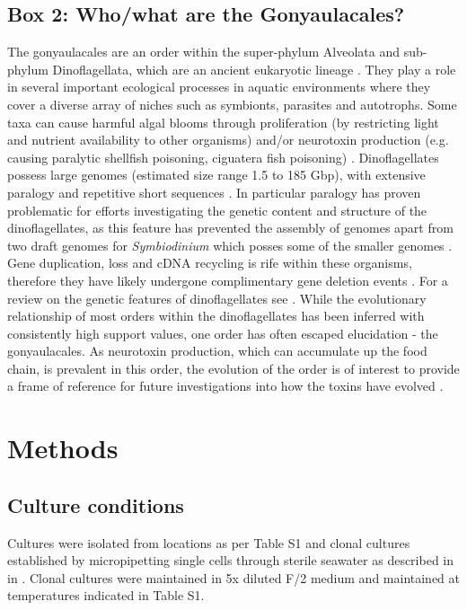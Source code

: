 \documentclass[fleqn,10pt,lineno]{wlpeerj} %
\begin{document}
\subsection*{Box 2: Who/what are the Gonyaulacales?}
\label{sec:dinobox}
The gonyaulacales are an order within the super-phylum Alveolata and sub-phylum Dinoflagellata, which are an ancient eukaryotic lineage \citep{moldowan1998biogeochemical}. 
They play a role in several important ecological processes in aquatic environments where they cover a diverse array of niches such as symbionts, parasites and autotrophs. 
Some taxa can cause harmful algal blooms through proliferation (by restricting light and nutrient availability to other organisms) and/or neurotoxin production (e.g. causing paralytic shellfish poisoning, ciguatera fish poisoning) \citep{murray2016unravelling}.
Dinoflagellates possess large genomes (estimated size range 1.5 to 185 Gbp), with extensive paralogy and repetitive short sequences  \citep{casabianca2017genome}. 
In particular paralogy has proven problematic for efforts investigating the genetic content and structure of the dinoflagellates, as this feature has prevented the assembly of genomes apart from two draft genomes for \textit{Symbiodinium} which posses some of the smaller genomes \citep{shoguchi2013draft,lin2015symbiodinium}. 
Gene duplication, loss and cDNA recycling is rife within these organisms, therefore they have likely undergone complimentary gene deletion events \citep{slamovits2008widespread,murray2015gene,shoguchi2018two}. 
For a review on the genetic features of dinoflagellates see \cite{murray2016unravelling}.
While the evolutionary relationship of most orders within the dinoflagellates has been inferred with consistently high support values, one order has often escaped elucidation - the gonyaulacales. 
As neurotoxin production, which can accumulate up the food chain, is prevalent in this order, the evolution of the order is of interest to provide a frame of reference for future investigations into how the toxins have evolved \citep{shalchian2006combined,zhang2007three,saldarriaga2004molecular,hoppenrath2010dinoflagellate,murray2005improving}. 

\section*{Methods}
\subsection*{Culture conditions}
Cultures were isolated from locations as per Table S1 and clonal cultures established by micropipetting single cells through sterile seawater as described in in \citep{kretzschmar2017characterization}. 
Clonal cultures were maintained in 5x diluted F/2 medium \citep{holmes1991strain} and maintained at temperatures indicated in Table S1. 
\end{document}

